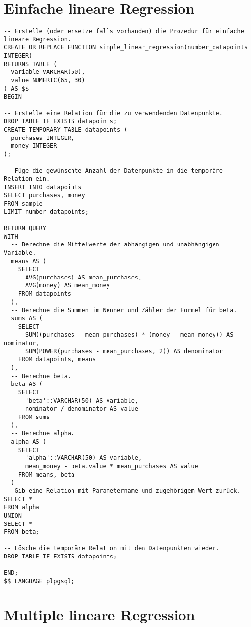 \section{Einfache lineare Regression}
\label{appendix:E:1}

\begin{verbatim}
-- Erstelle (oder ersetze falls vorhanden) die Prozedur für einfache lineare Regression.
CREATE OR REPLACE FUNCTION simple_linear_regression(number_datapoints INTEGER)
RETURNS TABLE (
  variable VARCHAR(50),
  value NUMERIC(65, 30)
) AS $$
BEGIN

-- Erstelle eine Relation für die zu verwendenden Datenpunkte.
DROP TABLE IF EXISTS datapoints;
CREATE TEMPORARY TABLE datapoints (
  purchases INTEGER,
  money INTEGER
);

-- Füge die gewünschte Anzahl der Datenpunkte in die temporäre Relation ein.
INSERT INTO datapoints
SELECT purchases, money
FROM sample
LIMIT number_datapoints;

RETURN QUERY
WITH
  -- Berechne die Mittelwerte der abhängigen und unabhängigen Variable.
  means AS (
    SELECT
      AVG(purchases) AS mean_purchases,
      AVG(money) AS mean_money
    FROM datapoints
  ),
  -- Berechne die Summen im Nenner und Zähler der Formel für beta.
  sums AS (
    SELECT
      SUM((purchases - mean_purchases) * (money - mean_money)) AS nominator,
      SUM(POWER(purchases - mean_purchases, 2)) AS denominator
    FROM datapoints, means
  ),
  -- Berechne beta.
  beta AS (
    SELECT
      'beta'::VARCHAR(50) AS variable,
      nominator / denominator AS value
    FROM sums
  ),
  -- Berechne alpha.
  alpha AS (
    SELECT
      'alpha'::VARCHAR(50) AS variable,
      mean_money - beta.value * mean_purchases AS value
    FROM means, beta
  )
-- Gib eine Relation mit Parametername und zugehörigem Wert zurück.
SELECT *
FROM alpha
UNION
SELECT *
FROM beta;

-- Lösche die temporäre Relation mit den Datenpunkten wieder.
DROP TABLE IF EXISTS datapoints;

END;
$$ LANGUAGE plpgsql;
\end{verbatim}

\section{Multiple lineare Regression}
\label{appendix:E:2}

